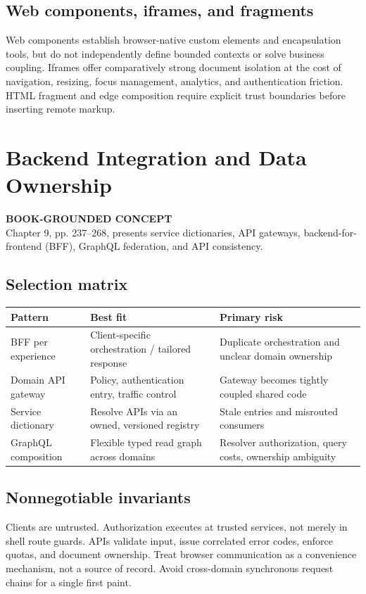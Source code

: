 \documentclass[11pt,letterpaper,oneside]{report}
\newcommand{\based}[1]{\begin{sourcebox}\textbf{BOOK-GROUNDED CONCEPT}\\#1\end{sourcebox}}
\begin{document}
\section{Web components, iframes, and fragments}
Web components establish browser-native custom elements and encapsulation tools, but do not independently define bounded contexts or solve business coupling. Iframes offer comparatively strong document isolation at the cost of navigation, resizing, focus management, analytics, and authentication friction. HTML fragment and edge composition require explicit trust boundaries before inserting remote markup.
\chapter{Backend Integration and Data Ownership}
\based{Chapter 9, pp. 237--268, presents service dictionaries, API gateways, backend-for-frontend (BFF), GraphQL federation, and API consistency.}
\section{Selection matrix}
\begin{tabularx}{\linewidth}{>{\raggedright\arraybackslash}p{.25\linewidth}>{\raggedright\arraybackslash}X >{\raggedright\arraybackslash}X}\toprule Pattern & Best fit & Primary risk \\\midrule
BFF per experience & Client-specific orchestration / tailored response & Duplicate orchestration and unclear domain ownership\\
Domain API gateway & Policy, authentication entry, traffic control & Gateway becomes tightly coupled shared code\\
Service dictionary & Resolve APIs via an owned, versioned registry & Stale entries and misrouted consumers\\
GraphQL composition & Flexible typed read graph across domains & Resolver authorization, query costs, ownership ambiguity\\\bottomrule\end{tabularx}
\section{Nonnegotiable invariants}
Clients are untrusted. Authorization executes at trusted services, not merely in shell route guards. APIs validate input, issue correlated error codes, enforce quotas, and document ownership. Treat browser communication as a convenience mechanism, not a source of record. Avoid cross-domain synchronous request chains for a single first paint.
\end{document}
